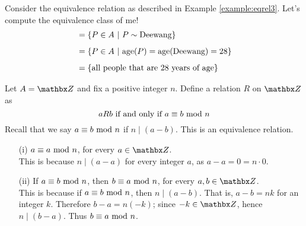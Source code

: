 \vspace*{1em}

\begin{example}
Consider the equivalence relation as described in Example \ref{example:eqrel3}. Let's compute the equivalence class of me!
\begin{align*}
[\text{Deewang}] &= \setp{P \in A}{P \sim \text{Deewang}}\\[0.5em]
 &= \setp{P \in A}{\text{age}(P) = \text{age}(\text{Deewang}) = 28}\\[0.5em]
 &= \set{\text{all people that are $28$ years of age}}
\end{align*}
\end{example}

\vspace*{1em}

\begin{example}\label{example:congeq}
Let $A = \zz$ and fix a positive integer $n$. Define a relation $R$ on $\zz$ as
\[aRb \text{ if and only if } a\equiv b \text{ mod }{n}\]
Recall that we say $a\equiv b\text{ mod }{n}$ if $n\mid (a - b)$. This is an equivalence relation.
\begin{itemize}[itemsep=1em]
\item[(i)] $a \equiv a \text{ mod }{n}$, for every $a \in \zz$.\\[0.5em]
This is because $n\mid (a-a)$ for every integer $a$, as $a - a = 0 = n\cdot 0$.

\item[(ii)] If $a \equiv b \text{ mod }{n}$, then $b \equiv a \text{ mod }{n}$, for every $a,b \in \zz$.\\[0.5em]
This is because if $a \equiv b \text{ mod }{n}$, then $n\mid (a - b)$. That is, $a - b = nk$ for an integer $k$. Therefore $b - a = n(-k)$; since $-k \in \zz$, hence $n\mid (b-a)$. Thus $b \equiv a \text{ mod }{n}$.


\end{itemize}
\end{example}
